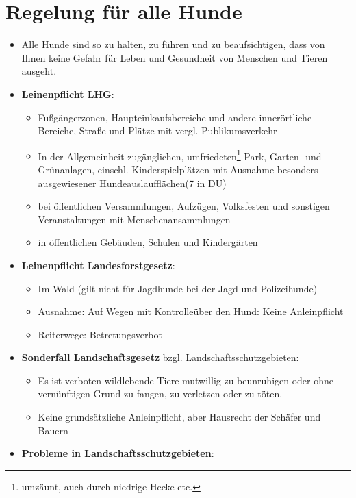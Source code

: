 \clearpage
\section{Regelung für alle Hunde}
    \begin{itemize}
        \item Alle Hunde sind so zu halten, zu führen und zu beaufsichtigen, dass von Ihnen keine Gefahr für Leben und Gesundheit von Menschen und Tieren ausgeht.
        \item \textbf{Leinenpflicht LHG}:
        \begin{itemize}
             \item Fußgängerzonen, Haupteinkaufsbereiche und andere innerörtliche Bereiche, Straße und Plätze mit vergl. Publikumsverkehr
             \item In der Allgemeinheit zugänglichen, umfriedeten\footnote{\glqq umzäunt\grqq, auch durch niedrige Hecke etc.} Park, Garten- und Grünanlagen, einschl. Kinderspielplätzen mit Ausnahme besonders ausgewiesener Hundeauslaufflächen(7 in DU)
             \item bei öffentlichen Versammlungen, Aufzügen, Volksfesten und sonstigen Veranstaltungen mit Menschenansammlungen
             \item in öffentlichen Gebäuden, Schulen und Kindergärten
         \end{itemize}
         \item \textbf{Leinenpflicht Landesforstgesetz}:
         \begin{itemize}
             \item Im Wald (gilt nicht für Jagdhunde bei der Jagd und Polizeihunde)
             \item Ausnahme: Auf Wegen mit \glqq Kontrolle\grqq über den Hund: Keine Anleinpflicht
             \item Reiterwege: Betretungsverbot
         \end{itemize}
         \item \textbf{Sonderfall Landschaftsgesetz} bzgl. Landschaftsschutzgebieten:
         \begin{itemize}
             \item Es ist verboten wildlebende Tiere mutwillig zu beunruhigen oder ohne vernünftigen Grund zu fangen, zu verletzen oder zu töten.
             \item Keine grundsätzliche Anleinpflicht, aber Hausrecht der Schäfer und Bauern
         \end{itemize}
         \item \textbf{Probleme in Landschaftsschutzgebieten}:

\end{itemize}

